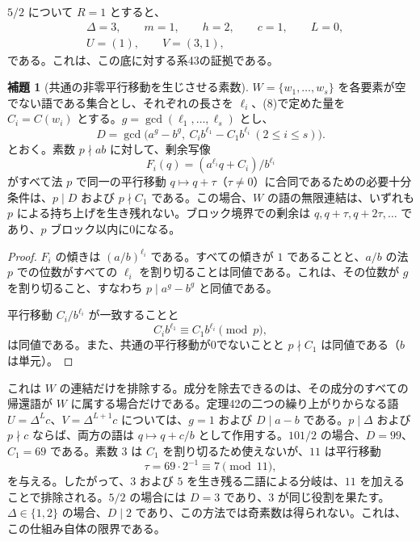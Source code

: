 \documentclass[11pt,reqno]{amsart}
\theoremstyle{definition}
\newtheorem{lemma}[theorem]{補題}
\theoremstyle{definition}
\theoremstyle{remark}
\begin{document}
\(5/2\) について \(R=1\) とすると、
\[
\begin{aligned}
&\Delta=3,\qquad m=1,\qquad h=2,\qquad c=1,\qquad L=0,\\
&U=(1),\qquad V=(3,1),
\end{aligned}
\]
である。これは、この底に対する系43の証拠である。

\begin{samepage}
\begin{lemma}[共通の非零平行移動を生じさせる素数]\leavevmode\label{thm:72}
\(W=\{w_1,\ldots,w_s\}\) を各要素が空でない語である集合とし、それぞれの長さを \(\ell_i\)、(8)で定めた量を \(C_i=C(w_i)\) とする。\(g=\gcd(\ell_1,\ldots,\ell_s)\) とし、
\[
D=\gcd\bigl(a^g-b^g,\ C_ib^{\ell_1}-C_1b^{\ell_i}\ (2\le i\le s)\bigr).
\]
とおく。素数 \(p\nmid ab\) に対して、剰余写像
\[
F_i(q)=(a^{\ell_i}q+C_i)/b^{\ell_i}
\]
がすべて法 \(p\) で同一の平行移動 \(q\mapsto q+\tau\)（\(\tau\ne0\)）に合同であるための必要十分条件は、\(p\mid D\) および \(p\nmid C_1\) である。この場合、\(W\) の語の無限連結は、いずれも \(p\) による持ち上げを生き残れない。ブロック境界での剰余は \(q,q+\tau,q+2\tau,\ldots\) であり、\(p\) ブロック以内に0になる。
\label{thm-end:72}
\end{lemma}
\end{samepage}

\begin{proof}\leavevmode\label{proof:72}
\(F_i\) の傾きは \((a/b)^{\ell_i}\) である。すべての傾きが \(1\) であることと、\(a/b\) の法 \(p\) での位数がすべての \(\ell_i\) を割り切ることは同値である。これは、その位数が \(g\) を割り切ること、すなわち \(p\mid a^g-b^g\) と同値である。

平行移動 \(C_i/b^{\ell_i}\) が一致することと
\[
C_ib^{\ell_1}\equiv C_1b^{\ell_i}\pmod p,
\]
は同値である。また、共通の平行移動が0でないことと \(p\nmid C_1\) は同値である（\(b\) は単元）。\qedhere
\end{proof}

これは \(W\) の連結だけを排除する。成分を除去できるのは、その成分のすべての帰還語が \(W\) に属する場合だけである。定理42の二つの繰り上がりからなる語 \(U=\Delta^Lc\)、\(V=\Delta^{L+1}c\) については、\(g=1\) および \(D\mid a-b\) である。\(p\mid\Delta\) および \(p\nmid c\) ならば、両方の語は \(q\mapsto q+c/b\) として作用する。\(101/2\) の場合、\(D=99\)、\(C_1=69\) である。素数 \(3\) は \(C_1\) を割り切るため使えないが、\(11\) は平行移動
\[
\tau=69\cdot2^{-1}\equiv7\pmod{11},
\]
を与える。したがって、\(3\) および \(5\) を生き残る二語による分岐は、\(11\) を加えることで排除される。\(5/2\) の場合には \(D=3\) であり、\(3\) が同じ役割を果たす。\(\Delta\in
\{1,2\}\) の場合、\(D\mid2\) であり、この方法では奇素数は得られない。これは、この仕組み自体の限界である。
\end{document}
